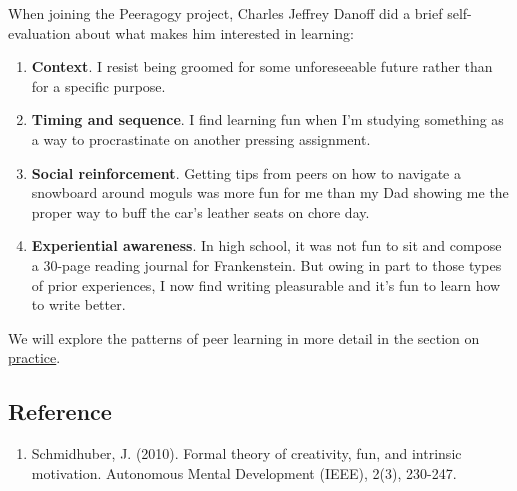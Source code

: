 When joining the Peeragogy project, Charles Jeffrey Danoff did a brief
self-evaluation about what makes him interested in learning:

\begin{enumerate}
\item
  \textbf{Context}. I resist being groomed for some unforeseeable future
  rather than for a specific purpose.
\item
  \textbf{Timing and sequence}. I find learning fun when I'm studying
  something as a way to procrastinate on another pressing assignment.
\item
  \textbf{Social reinforcement}. Getting tips from peers on how to
  navigate a snowboard around moguls was more fun for me than my Dad
  showing me the proper way to buff the car's leather seats on chore
  day.
\item
  \textbf{Experiential awareness}. In high school, it was not fun to sit
  and compose a 30-page reading journal for Frankenstein. But owing in
  part to those types of prior experiences, I now find writing
  pleasurable and it's fun to learn how to write better.
\end{enumerate}
We will explore the patterns of peer learning in more detail in the
section on \href{http://peeragogy.org/practice/}{practice}.

\subsection{Reference}

\begin{enumerate}
\item
  Schmidhuber, J. (2010). Formal theory of creativity, fun, and
  intrinsic motivation. Autonomous Mental Development (IEEE), 2(3),
  230-247.
\end{enumerate}
